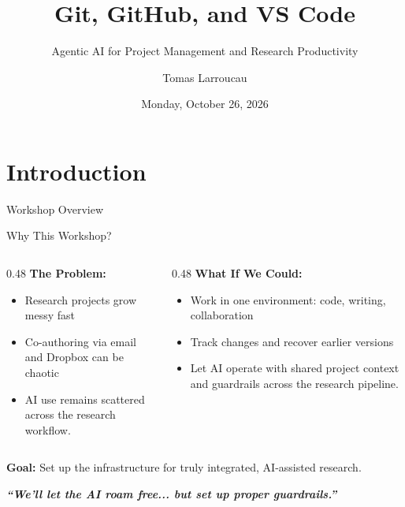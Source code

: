 \documentclass[11pt,aspectratio=169]{beamer}
\title{Git, GitHub, and VS Code}
\subtitle{Agentic AI for Project Management and Research Productivity}
\author{Tomas Larroucau }
\institute{Arizona State University}
\date{Monday, October 26, 2026}
\begin{document}
\section{Introduction}

\begin{frame}
\titlepage
\end{frame}


\begin{frame}{Workshop Overview}
\tableofcontents
\end{frame}


\begin{frame}{Why This Workshop?}
\begin{columns}[t]
\begin{column}{0.48\textwidth}
\textbf{The Problem:}
\begin{itemize}
    \item Research projects grow messy fast
    \item Co-authoring via email and Dropbox can be chaotic
    \item AI use remains scattered across the research workflow.
\end{itemize}
\end{column}

\begin{column}{0.48\textwidth}
\textbf{What If We Could:}
\begin{itemize}
    \item Work in one environment: code, writing, collaboration
    \item Track changes and recover earlier versions
    \item Let AI operate with shared project context and guardrails across the research pipeline.
\end{itemize}
\end{column}
\end{columns}

\vfill

\centering
\textbf{Goal:} Set up the infrastructure for truly integrated, AI-assisted research.

\vspace{0.5cm}

\textit{\textbf{``We'll let the AI roam free... but set up proper guardrails.''}}

\vfill
\end{frame}
\end{document}
